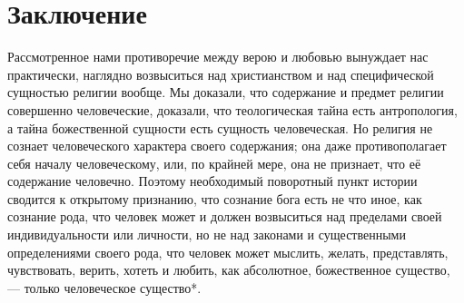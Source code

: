 \documentclass[12pt,oneside]{book}
\begin{document}
\chapter{Заключение}


Рассмотренное нами противоречие между верою и любовью вынуждает нас практически, наглядно возвыситься над христианством и над специфической сущностью религии вообще. Мы доказали, что содержание и предмет религии совершенно человеческие, доказали, что теологическая тайна есть антропология, а тайна божественной сущности есть сущность человеческая. Но религия не сознает человеческого характера своего содержания; она даже противополагает себя началу человеческому, или, по крайней мере, она не признает, что её содержание человечно. Поэтому необходимый поворотный пункт истории сводится к открытому признанию, что сознание бога есть не что иное, как сознание рода, что человек может и должен возвыситься над пределами своей индивидуальности или личности, но не над законами и существенными определениями своего рода, что человек может мыслить, желать, представлять, чувствовать, верить, хотеть и любить, как абсолютное, божественное существо, --- только человеческое существо*\let\svthefootnote\thefootnote\let\thefootnote\relax{}\let\thefootnote\svthefootnote.
\end{document}
